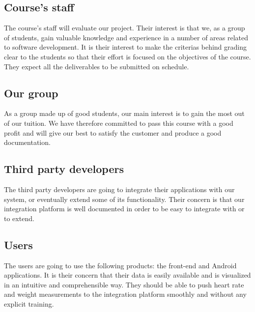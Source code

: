 \subsection{Course's staff}
The course's staff will evaluate our project. Their interest is that we, as a group of students,
gain valuable knowledge and experience in a number of areas related to software development.
It is their interest to make the criterias behind grading clear to the students so that their effort is focused on the objectives of the course.
They expect all the deliverables to be submitted on schedule.

\subsection{Our group}
As a group made up of good students, our main interest is to gain the most out of our tuition.
We have therefore committed to pass this course with a good profit and will give our best to satisfy the customer and produce a good documentation.

\subsection{Third party developers}
The third party developers are going to integrate their applications with our system, or eventually extend some of its functionality. 
Their concern is that our integration platform is well documented in order to be easy to integrate with or to extend.

\subsection{Users}
The users are going to use the following products: the front-end and Android applications.
It is their concern that their data is easily available and is visualized in an intuitive and comprehensible way.
They should be able to push heart rate and weight measurements to the integration platform smoothly and without any explicit training.


